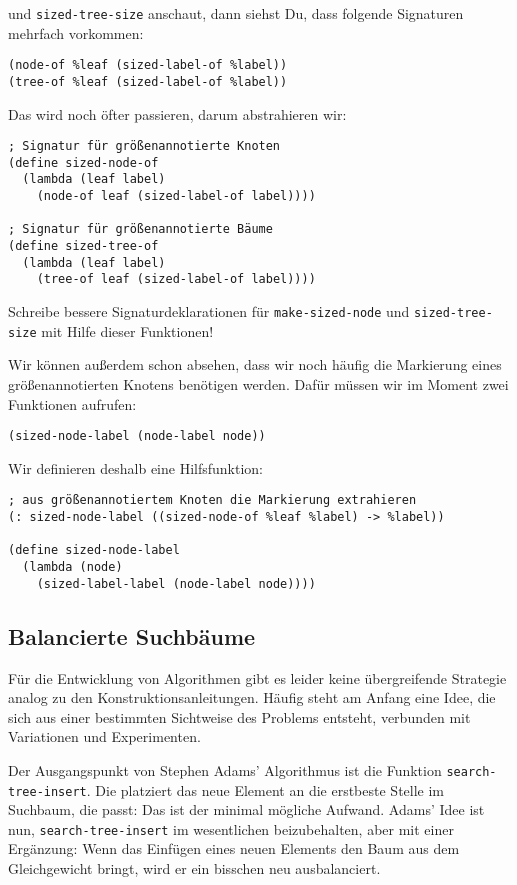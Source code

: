 und \lstinline{sized-tree-size} anschaut, dann siehst Du, dass
folgende Signaturen mehrfach vorkommen:
%
\begin{lstlisting}
(node-of %leaf (sized-label-of %label))
(tree-of %leaf (sized-label-of %label))
\end{lstlisting}
%
Das wird noch öfter passieren, darum abstrahieren wir:
%
\begin{lstlisting}
; Signatur für größenannotierte Knoten
(define sized-node-of
  (lambda (leaf label)
    (node-of leaf (sized-label-of label))))

; Signatur für größenannotierte Bäume
(define sized-tree-of
  (lambda (leaf label)
    (tree-of leaf (sized-label-of label))))
\end{lstlisting}
%
\begin{aufgabeinline}
  Schreibe bessere Signaturdeklarationen für
  \lstinline{make-sized-node} und \lstinline{sized-tree-size} mit
  Hilfe dieser Funktionen!
\end{aufgabeinline}
%
Wir können außerdem schon absehen, dass wir noch häufig die Markierung
eines größenannotierten Knotens benötigen werden.  Dafür müssen wir im
Moment zwei Funktionen aufrufen:
%
\begin{lstlisting}
(sized-node-label (node-label node))
\end{lstlisting}
%
Wir definieren deshalb eine Hilfsfunktion:
%
\begin{lstlisting}
; aus größenannotiertem Knoten die Markierung extrahieren
(: sized-node-label ((sized-node-of %leaf %label) -> %label))

(define sized-node-label
  (lambda (node)
    (sized-label-label (node-label node))))
\end{lstlisting}

\subsection{Balancierte Suchbäume}

Für die Entwicklung von Algorithmen gibt es leider keine übergreifende
Strategie analog zu den Konstruktionsanleitungen. Häufig steht am
Anfang eine Idee, die sich aus einer bestimmten Sichtweise des
Problems entsteht, verbunden mit Variationen und Experimenten.

Der Ausgangspunkt von Stephen Adams' Algorithmus ist die Funktion
\lstinline{search-tree-insert}.  Die platziert das neue Element an die
erstbeste Stelle im Suchbaum, die passt: Das ist der minimal mögliche
Aufwand.  Adams' Idee ist nun, \lstinline{search-tree-insert} im
wesentlichen beizubehalten, aber mit einer Ergänzung: Wenn das
Einfügen eines neuen Elements den Baum aus dem Gleichgewicht bringt,
wird er ein bisschen neu ausbalanciert.


